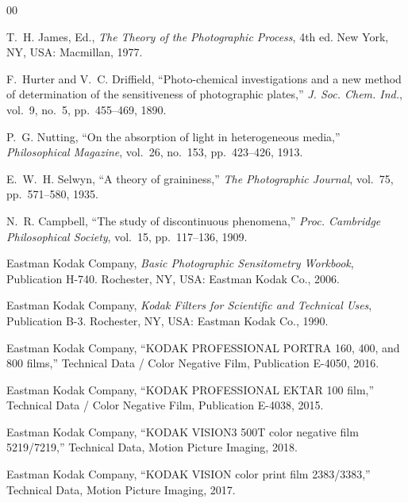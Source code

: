 \begin{thebibliography}{00}

T.~H. James, Ed., \emph{The Theory of the Photographic Process}, 4th ed.
New York, NY, USA: Macmillan, 1977.

F.~Hurter and V.~C. Driffield, ``Photo-chemical investigations and a new method
of determination of the sensitiveness of photographic plates,'' \emph{J. Soc.
Chem. Ind.}, vol.~9, no.~5, pp.~455--469, 1890.

P.~G. Nutting, ``On the absorption of light in heterogeneous media,''
\emph{Philosophical Magazine}, vol.~26, no.~153, pp.~423--426, 1913.

E.~W.~H. Selwyn, ``A theory of graininess,'' \emph{The Photographic Journal},
vol.~75, pp.~571--580, 1935.

N.~R. Campbell, ``The study of discontinuous phenomena,'' \emph{Proc. Cambridge
Philosophical Society}, vol.~15, pp.~117--136, 1909.

Eastman Kodak Company, \emph{Basic Photographic Sensitometry Workbook},
Publication H-740. Rochester, NY, USA: Eastman Kodak Co., 2006.

Eastman Kodak Company, \emph{Kodak Filters for Scientific and Technical Uses},
Publication B-3. Rochester, NY, USA: Eastman Kodak Co., 1990.

Eastman Kodak Company, ``KODAK PROFESSIONAL PORTRA 160, 400, and 800 films,''
Technical Data / Color Negative Film, Publication E-4050, 2016.

Eastman Kodak Company, ``KODAK PROFESSIONAL EKTAR 100 film,'' Technical Data /
Color Negative Film, Publication E-4038, 2015.

Eastman Kodak Company, ``KODAK VISION3 500T color negative film 5219/7219,''
Technical Data, Motion Picture Imaging, 2018.

Eastman Kodak Company, ``KODAK VISION color print film 2383/3383,'' Technical
Data, Motion Picture Imaging, 2017.


\end{thebibliography}
